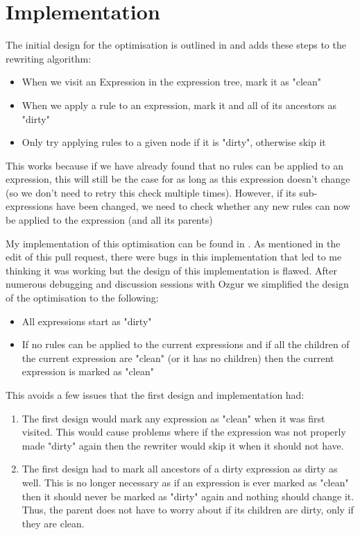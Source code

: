 \section{Implementation}

The initial design for the optimisation is outlined in
 and adds
these steps to the rewriting algorithm:

\begin{itemize}
	\item When we visit an Expression in the expression tree, mark it as "clean"
	\item When we apply a rule to an expression, mark it and all of its ancestors as "dirty"
	\item Only try applying rules to a given node if it is "dirty", otherwise skip it
\end{itemize}

This works because if we have already found that no rules can be applied to an
expression, this will still be the case for as long as this expression doesn't
change (so we don't need to retry this check multiple times). However, if its
sub-expressions have been changed, we need to check whether any new rules can
now be applied to the expression (and all its parents)

My implementation of this optimisation can be found in . As mentioned in the
edit of this pull request, there were bugs in this implementation that led to me
thinking it was working but the design of this implementation is flawed. After
numerous debugging and discussion sessions with Ozgur we simplified the design of the
optimisation to the following:

\begin{itemize}
	\item All expressions start as "dirty"
	\item If no rules can be applied to the current expressions and if all the
	      children of the current expression are "clean" (or it has no children) then
	      the current expression is marked as "clean"
\end{itemize}

This avoids a few issues that the first design and implementation had:
\begin{enumerate}
	\item The first design would mark any expression as "clean" when it was first visited. This would cause
	      problems where if the expression was not properly made "dirty" again then the rewriter would skip
	      it when it should not have.
	\item The first design had to mark all ancestors of a dirty expression as
	      dirty as well. This is no longer necessary as if an expression is ever
	      marked as "clean" then it should never be marked as "dirty" again and
	      nothing should change it. Thus, the parent does not have to worry about if
	      its children are dirty, only if they are clean.
\end{enumerate}

